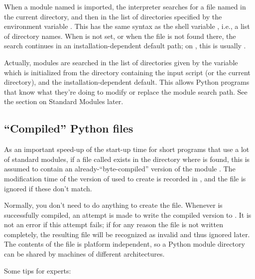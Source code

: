 \documentclass{manual}
\begin{document}
When a module named  is imported, the interpreter searches
for a file named  in the current directory,
and then in the list of directories specified by
the environment variable .  This has the same syntax as
the shell variable , i.e., a list of
directory names.  When  is not set, or when the file
is not found there, the search continues in an installation-dependent
default path; on \UNIX{}, this is usually .

Actually, modules are searched in the list of directories given by the 
variable  which is initialized from the directory 
containing the input script (or the current directory),
 and the installation-dependent default.  This allows
Python programs that know what they're doing to modify or replace the 
module search path.  See the section on Standard Modules later.

\subsection{``Compiled'' Python files}

As an important speed-up of the start-up time for short programs that
use a lot of standard modules, if a file called  exists
in the directory where  is found, this is assumed to
contain an already-``byte-compiled'' version of the module .
The modification time of the version of  used to create
 is recorded in , and the file is
ignored if these don't match.

Normally, you don't need to do anything to create the  file.
Whenever  is successfully compiled, an attempt is made to
write the compiled version to .  It is not an error if
this attempt fails; if for any reason the file is not written
completely, the resulting  file will be recognized as
invalid and thus ignored later.  The contents of the 
file is platform independent, so a Python module directory can be
shared by machines of different architectures.

Some tips for experts:
\end{document}
